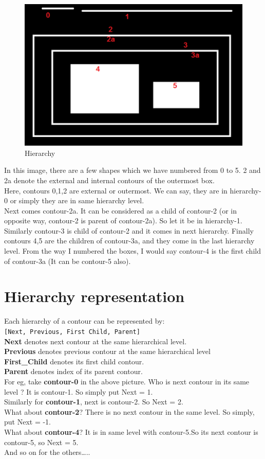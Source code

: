 \documentclass[]{article}
\begin{document}
\begin{figure}[htbp]
\centering
\includegraphics{cont1.png}
\caption{Hierarchy}
\end{figure}

In this image, there are a few shapes which we have numbered from 0 to
5. 2 and 2a denote the external and internal contours of the outermost
box.\\
Here, contours 0,1,2 are external or outermost. We can say, they are in
hierarchy-0 or simply they are in same hierarchy level.\\
Next comes contour-2a. It can be considered as a child of contour-2 (or
in opposite way, contour-2 is parent of contour-2a). So let it be in
hierarchy-1. Similarly contour-3 is child of contour-2 and it comes in
next hierarchy. Finally contours 4,5 are the children of contour-3a, and
they come in the last hierarchy level. From the way I numbered the
boxes, I would say contour-4 is the first child of contour-3a (It can be
contour-5 also).

\section{Hierarchy representation}\label{hierarchy-representation}

Each hierarchy of a contour can be represented by:\\
\texttt{{[}Next,\ Previous,\ First\ Child,\ Parent{]}}\\
\textbf{Next} denotes next contour at the same hierarchical level.\\
\textbf{Previous} denotes previous contour at the same hierarchical
level\\
\textbf{First\_Child} denotes its first child contour.\\
\textbf{Parent} denotes index of its parent contour.\\
For eg, take \textbf{contour-0} in the above picture. Who is next
contour in its same level ? It is contour-1. So simply put Next = 1.\\
Similarly for \textbf{contour-1}, next is contour-2. So Next = 2.\\
What about \textbf{contour-2}? There is no next contour in the same
level. So simply, put Next = -1.\\
What about \textbf{contour-4}? It is in same level with contour-5.So its
next contour is contour-5, so Next = 5.\\
And so on for the others\ldots{}..
\end{document}
